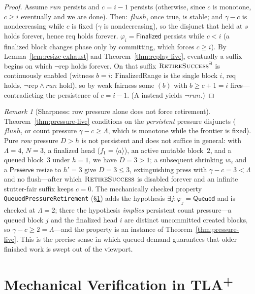 \documentclass[11pt]{article}
\newcommand{\seq}[1]{\langle #1\rangle}
\newcommand{\Queued}{\mathsf{Queued}}
\newcommand{\Finalized}{\mathsf{Finalized}}
\newcommand{\Preserve}{\mathsf{Preserve}}
\newcommand{\Press}{\mathrm{press}}
\newcommand{\Req}{\mathrm{req}}
\newcommand{\Repl}{\mathrm{rep}}
\newcommand{\flush}{\mathit{flush}}
\newcommand{\run}{\mathit{run}}
\newcommand{\created}{\gamma}
\newcommand{\MaxLive}{\Lambda}
\newcommand{\act}[1]{\text{\normalfont\scshape #1}}
\newcommand{\tla}[1]{\texttt{#1}}
\theoremstyle{definition}
\theoremstyle{remark}
\newtheorem{remark}[theorem]{Remark}
\begin{document}
\begin{proof}
Assume $\run$ persists and $c=i{-}1$ persists (otherwise, since $c$ is
monotone, $c\ge i$ eventually and we are done). Then: $\flush$, once true,
is stable; and $\created-c$ is nondecreasing while $c$ is fixed
($\created$ is nondecreasing), so the disjunct that held at $s$ holds
forever, hence $\Req$ holds forever. $\varphi_i=\Finalized$ persists while
$c<i$ (a finalized block changes phase only by committing, which forces
$c\ge i$). By Lemma~\ref{lem:resize-exhaust} and
Theorem~\ref{thm:replay-live}, eventually a suffix begins on which
$\neg\Repl$ holds forever. On that suffix
$\act{RetireSuccess}^{\exists}$ is continuously enabled (witness $b=i$:
$\mathrm{FinalizedRange}$ is the single block $i$, $\Req$ holds,
$\neg\Repl\wedge\run$ hold), so by weak fairness some
\act{RetireSuccess}$(b)$ with $b\ge c+1=i$ fires---contradicting the
persistence of $c=i{-}1$. (A \act{RetireFailure} instead yields $\neg\run$.)
\end{proof}

\begin{remark}[Sharpness: row pressure alone does not force retirement]
\label{rem:sharp}
Theorem~\ref{thm:pressure-live} conditions on the \emph{persistent} pressure
disjuncts ($\flush$, or count pressure $\created-c\ge\MaxLive$, which is
monotone while the frontier is fixed). Pure \emph{row} pressure $D>h$ is not
persistent and does not suffice in general: with $\MaxLive=4$, $N=3$, a
finalized head ($f_1=\seq{a}$), an active mutable block~$2$, and a queued
block~$3$ under $h=1$, we have $D=3>1$; a subsequent \act{Update} shrinking
$w_2$ and a $\Preserve$ resize to $h'=3$ give $D=3\le 3$, extinguishing
$\Press$ with $\created-c=3<\MaxLive$ and no flush---after which
$\act{RetireSuccess}$ is disabled forever and an infinite stutter-fair
suffix keeps $c=0$. The mechanically checked property
\tla{QueuedPressureRetirement} (\S\ref{sec:tlc}) adds the hypothesis
$\exists j:\varphi_j=\Queued$ and is checked at $\MaxLive=2$; there the
hypothesis \emph{implies} persistent count pressure---a queued block $j$ and
the finalized head $i$ are distinct uncommitted created blocks, so
$\created-c\ge 2=\MaxLive$---and the property is an instance of
Theorem~\ref{thm:pressure-live}. This is the precise sense in which queued
demand guarantees that older finished work is swept out of the viewport.
\end{remark}

\section{Mechanical Verification in TLA\texorpdfstring{\textsuperscript{+}}{+}}
\label{sec:tlc}
\end{document}

